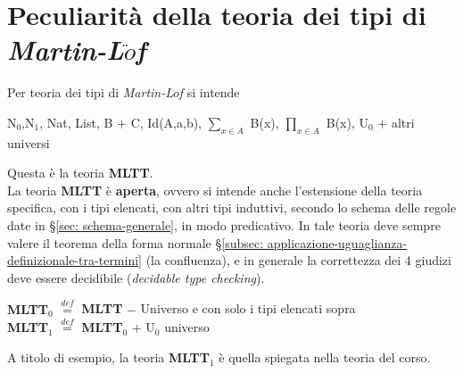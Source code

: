 \section{Peculiarit\`a della teoria dei tipi di \textit{Martin-L$\ddot{o}$f}}
\label{sec:peculiarit\`a-della-teoria-dei-tipi}
Per teoria dei tipi di \textit{Martin-L$\ddot{o}$f} si intende
\begin{center}
N$_0$,N$_1$, Nat, List, B $+$ C, Id(A,a,b), $\sum\limits_{x \in A}$ B(x), $\prod\limits_{x \in A}$ B(x), U$_0$ $+$ altri universi
\end{center}
\noindent
Questa \`e la teoria \textbf{MLTT}.\\
La teoria \textbf{MLTT} \`e \textbf{aperta}, ovvero si intende anche l'estensione della teoria specifica, con i tipi elencati, con altri tipi induttivi, secondo lo schema delle regole date in \S\ref{sec: schema-generale}, in modo predicativo. In tale teoria deve sempre valere il teorema della forma normale \S \ref{subsec: applicazione-uguaglianza-definizionale-tra-termini} (la confluenza), e in generale la correttezza dei 4 giudizi deve essere decidibile (\textit{decidable type checking}).
\noindent
\begin{center}\textbf{MLTT$_0$} ${\overset{\mathit{def}}{=}}$ \textbf{MLTT} $-$ Universo e con solo i tipi elencati sopra\\
\textbf{MLTT$_1$} ${\overset{\mathit{def}}{=}}$ \textbf{MLTT$_0$} $+$ U$_0$ universo\end{center}
\noindent
A titolo di esempio, la teoria \textbf{MLTT$_1$} \`e quella spiegata nella teoria del corso.

